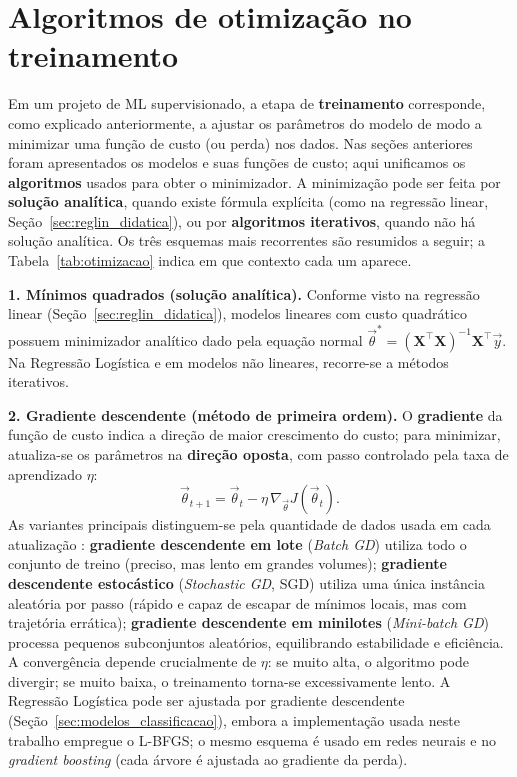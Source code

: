 \section{Algoritmos de otimização no treinamento}
\label{sec:otimizacao}

Em um projeto de ML supervisionado, a etapa de \textbf{treinamento} corresponde, como explicado anteriormente, a ajustar os parâmetros do modelo de modo a minimizar uma função de custo (ou perda) nos dados. Nas seções anteriores foram apresentados os modelos e suas funções de custo; aqui unificamos os \textbf{algoritmos} usados para obter o minimizador. A minimização pode ser feita por \textbf{solução analítica}, quando existe fórmula explícita (como na regressão linear, Seção~\ref{sec:reglin_didatica}), ou por \textbf{algoritmos iterativos}, quando não há solução analítica. Os três esquemas mais recorrentes são resumidos a seguir; a Tabela~\ref{tab:otimizacao} indica em que contexto cada um aparece.

\textbf{1. Mínimos quadrados (solução analítica).} Conforme visto na regressão linear (Seção~\ref{sec:reglin_didatica}), modelos lineares com custo quadrático possuem minimizador analítico dado pela equação normal \(\vec{\theta}^* = (\mathbf{X}^\top \mathbf{X})^{-1} \mathbf{X}^\top \vec{y}\). Na Regressão Logística e em modelos não lineares, recorre-se a métodos iterativos.

\textbf{2. Gradiente descendente (método de primeira ordem).} O \textbf{gradiente} da função de custo indica a direção de maior crescimento do custo; para minimizar, atualiza-se os parâmetros na \textbf{direção oposta}, com passo controlado pela taxa de aprendizado \(\eta\):
\[
\vec{\theta}_{t+1} = \vec{\theta}_t - \eta \, \nabla_{\vec{\theta}} J(\vec{\theta}_t).
\]
As variantes principais distinguem-se pela quantidade de dados usada em cada atualização \citep{geron2019maos}: \textbf{gradiente descendente em lote} (\textit{Batch GD}) utiliza todo o conjunto de treino (preciso, mas lento em grandes volumes); \textbf{gradiente descendente estocástico} (\textit{Stochastic GD}, SGD) utiliza uma única instância aleatória por passo (rápido e capaz de escapar de mínimos locais, mas com trajetória errática); \textbf{gradiente descendente em minilotes} (\textit{Mini-batch GD}) processa pequenos subconjuntos aleatórios, equilibrando estabilidade e eficiência. A convergência depende crucialmente de \(\eta\): se muito alta, o algoritmo pode divergir; se muito baixa, o treinamento torna-se excessivamente lento. A Regressão Logística pode ser ajustada por gradiente descendente (Seção~\ref{sec:modelos_classificacao}), embora a implementação usada neste trabalho empregue o L-BFGS; o mesmo esquema é usado em redes neurais e no \textit{gradient boosting} (cada árvore é ajustada ao gradiente da perda).

